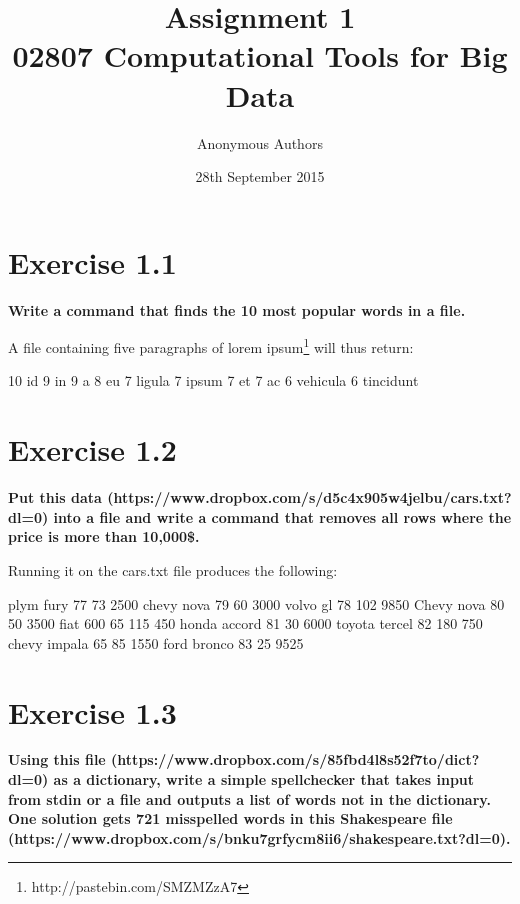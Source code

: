 \documentclass{article}
\title{Assignment 1\\02807 Computational Tools for Big Data}
\author{Anonymous Authors}
\date{28th September 2015}
\begin{document}
\maketitle
\newpage
\section{Exercise 1.1}
\textbf{Write a command that finds the 10 most popular words in a file.}


A file containing five paragraphs of lorem ipsum\footnote{http://pastebin.com/SMZMZzA7} will thus return:
\begin{pythonOutput}
     10 id
      9 in
      9 a
      8 eu
      7 ligula
      7 ipsum
      7 et
      7 ac
      6 vehicula
      6 tincidunt
\end{pythonOutput}
\section{Exercise 1.2}
\textbf{Put this data (https://www.dropbox.com/s/d5c4x905w4jelbu/cars.txt?dl=0) into a file and write a command that removes all rows where the price is more than 10,000\$.}

Running it on the cars.txt file produces the following:
\begin{pythonOutput}
plym    fury    77      73      2500
chevy   nova    79      60      3000
volvo   gl      78      102     9850
Chevy   nova    80      50      3500
fiat    600     65      115     450
honda   accord  81      30      6000
toyota  tercel  82      180     750
chevy   impala  65      85      1550
ford    bronco  83      25      9525
\end{pythonOutput}


\section{Exercise 1.3}
\textbf{Using this file (https://www.dropbox.com/s/85fbd4l8s52f7to/dict?dl=0) as a dictionary, write a simple spellchecker that takes input from stdin or a file and outputs a list of words not in the dictionary. One solution gets 721 misspelled words in this Shakespeare file (https://www.dropbox.com/s/bnku7grfycm8ii6/shakespeare.txt?dl=0).}

\end{document}
